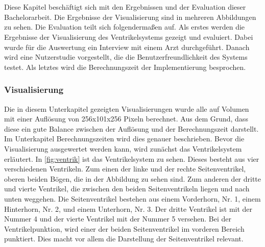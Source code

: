 \chapter{}
\label{sec:results}





Diese Kapitel beschäftigt sich mit den Ergebnissen und der Evaluation dieser Bachelorarbeit. Die Ergebnisse der Visualisierung sind in mehreren Abbildungen zu sehen. Die Evaluation teilt sich folgendermaßen auf. Als erstes werden die Ergebnisse der Visualisierung des Ventrikelsystems gezeigt und evaluiert. Dabei wurde für die Auswertung ein Interview mit einem Arzt durchgeführt. Danach wird eine Nutzerstudie vorgestellt, die die Benutzerfreundlichkeit des Systems testet. Als letztes wird die Berechnungszeit der Implementierung besprochen.


\subsection{Visualisierung}

Die in diesem Unterkapitel gezeigten Visualisierungen wurde alle auf Volumen mit einer Auflösung von 256x101x256 Pixeln berechnet. Aus dem Grund, dass diese ein gute Balance zwischen der Auflösung und der Berechnungszeit darstellt. Im Unterkapitel  Berechnungszeiten wird dies genauer beschrieben. Bevor die Visualisierung ausgewertet werden kann, wird zunächst das Ventrikelsystem erläutert.
\newline
In \autoref{fig:ventrik} ist das Ventrikelsystem zu sehen. Dieses besteht aus vier verschiedenen Ventrikeln. Zum einen der linke und der rechte Seitenventrikel, oberen beiden Bögen, die in der Abbildung zu sehen sind. Zum anderen der dritte und vierte Ventrikel, die zwischen den beiden Seitenventrikeln liegen und nach unten weggehen. Die Seitenventrikel bestehen aus einem Vorderhorn, Nr. 1,  einem Hinterhorn, Nr. 2, und einem Unterhorn, Nr. 3. Der dritte Ventrikel ist mit der Nummer 4 und der vierte Ventrikel mit der Nummer 5 versehen.
\newline
Bei der Ventrikelpunktion, wird einer der beiden Seitenventrikel im vorderen Bereich punktiert. Dies macht vor allem die Darstellung der Seitenventrikel relevant.

